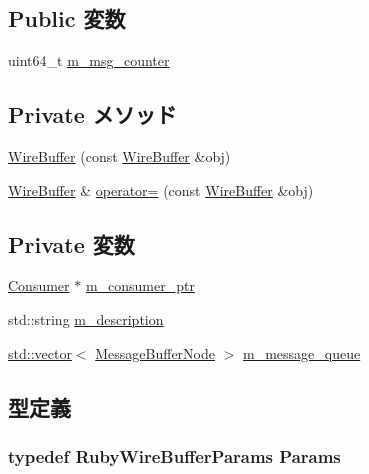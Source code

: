 \subsection*{Public 変数}
\begin{DoxyCompactItemize}
\item 
uint64\_\-t \hyperlink{classWireBuffer_a3d60a9aaa917e449f52162fd0e6d3f25}{m\_\-msg\_\-counter}
\end{DoxyCompactItemize}
\subsection*{Private メソッド}
\begin{DoxyCompactItemize}
\item 
\hyperlink{classWireBuffer_af3ac0ff9352e0f326be850ddb42f95d5}{WireBuffer} (const \hyperlink{classWireBuffer}{WireBuffer} \&obj)
\item 
\hyperlink{classWireBuffer}{WireBuffer} \& \hyperlink{classWireBuffer_add880f9d0522944b0126f058cc4276b7}{operator=} (const \hyperlink{classWireBuffer}{WireBuffer} \&obj)
\end{DoxyCompactItemize}
\subsection*{Private 変数}
\begin{DoxyCompactItemize}
\item 
\hyperlink{classConsumer}{Consumer} $\ast$ \hyperlink{classWireBuffer_a83dd1dc8eef330b0c0d184a4167b26b4}{m\_\-consumer\_\-ptr}
\item 
std::string \hyperlink{classWireBuffer_ad50eef5f7fcfa30f62e14f0fac2a4f6e}{m\_\-description}
\item 
\hyperlink{classstd_1_1vector}{std::vector}$<$ \hyperlink{classMessageBufferNode}{MessageBufferNode} $>$ \hyperlink{classWireBuffer_a39fe545546f6c318a857521c207f2823}{m\_\-message\_\-queue}
\end{DoxyCompactItemize}


\subsection{型定義}
\hypertarget{classWireBuffer_a7ad77180949dea9bc226a0f7571391a0}{
\subsubsection[{Params}]{\setlength{\rightskip}{0pt plus 5cm}typedef RubyWireBufferParams {\bf Params}}}
\label{classWireBuffer_a7ad77180949dea9bc226a0f7571391a0}



